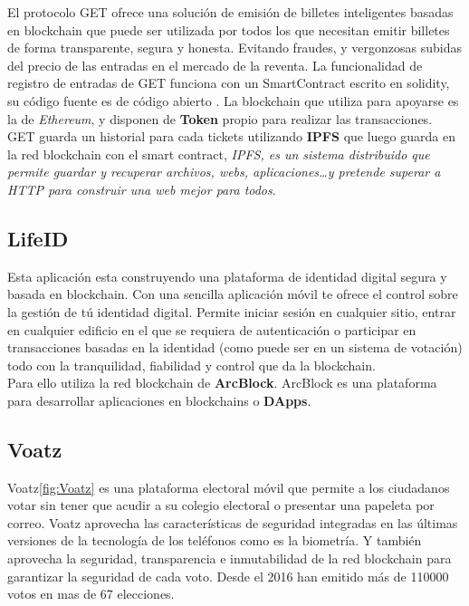 El protocolo GET ofrece una solución de emisión de billetes inteligentes basadas en blockchain que puede ser utilizada por todos los que necesitan emitir billetes de forma transparente, segura y honesta. Evitando fraudes, y vergonzosas subidas del precio de las entradas en el mercado de la reventa. La funcionalidad de registro de entradas de GET funciona con un SmartContract escrito en solidity, su código fuente es de código abierto \cite{srcGET}. La blockchain que utiliza para apoyarse es la de \emph{Ethereum}, y disponen de \textbf{Token} propio para realizar las transacciones\cite{tokGET}. GET guarda un historial para cada tickets utilizando \textbf{IPFS}\cite{IPFS} que luego guarda en la red blockchain con el smart contract, \textit{IPFS, es un sistema distribuido que permite guardar y recuperar archivos, webs, aplicaciones\dots y pretende superar a HTTP para construir una web mejor para todos}.

\subsection{LifeID}

Esta aplicación esta construyendo una plataforma de identidad digital segura y basada en blockchain. Con una sencilla aplicación móvil te ofrece el control sobre la gestión de tú identidad digital. Permite iniciar sesión en cualquier sitio, entrar en cualquier edificio en el que se requiera de autenticación o participar en transacciones basadas en la identidad (como puede ser en un sistema de votación) todo con la tranquilidad, fiabilidad y control que da la blockchain. \\ 

Para ello utiliza la red blockchain de \textbf{ArcBlock}\cite{webArc,alianzaArc}. ArcBlock es una plataforma para desarrollar aplicaciones en blockchains o \textbf{DApps}\cite{dapps}. 

\subsection{Voatz}

Voatz\ref{fig:Voatz} es una plataforma electoral móvil que permite a los ciudadanos votar sin tener que acudir a su colegio electoral o presentar una papeleta por correo. Voatz aprovecha las características de seguridad integradas en las últimas versiones de la tecnología de los teléfonos como es la biometría. Y también aprovecha la seguridad, transparencia e inmutabilidad de la red blockchain para garantizar la seguridad de cada voto. Desde el 2016 han emitido más de 110000 votos en mas de 67 elecciones. 

